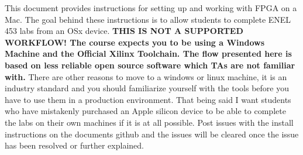 This document provides instructions for setting up and working with FPGA on a Mac. 
The goal behind these instructions is to allow students to complete ENEL 453 labs from an OSx device.
\textbf{THIS IS NOT A SUPPORTED WORKFLOW! 
The course expects you to be using a Windows Machine and the Official Xilinx Toolchain. 
The flow presented here is based on less reliable open source software which TAs are not familiar with.} 
There are other reasons to move to a windows or linux machine, it is an industry standard and you should familiarize yourself with the tools before you have to use them in a production environment. 
That being said I want students who have mistakenly purchased an Apple silicon device to be able to complete the labs on their own machines if it is at all possible. 
Post issues with the install instructions on the documents github and the issues will be cleared once the issue has been resolved or further explained.